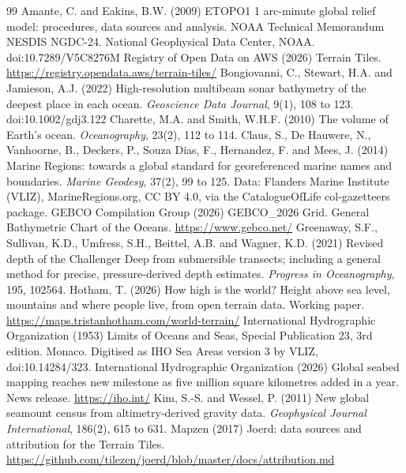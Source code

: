 \documentclass[11pt,a4paper]{article}
\begin{document}
\begin{thebibliography}{99}
 Amante, C. and Eakins, B.W. (2009) ETOPO1 1 arc-minute global relief model: procedures, data sources and analysis. NOAA Technical Memorandum NESDIS NGDC-24. National Geophysical Data Center, NOAA. doi:10.7289/V5C8276M
 Registry of Open Data on AWS (2026) Terrain Tiles. \url{https://registry.opendata.aws/terrain-tiles/}
 Bongiovanni, C., Stewart, H.A. and Jamieson, A.J. (2022) High-resolution multibeam sonar bathymetry of the deepest place in each ocean. \emph{Geoscience Data Journal}, 9(1), 108 to 123. doi:10.1002/gdj3.122
 Charette, M.A. and Smith, W.H.F. (2010) The volume of Earth's ocean. \emph{Oceanography}, 23(2), 112 to 114.
 Claus, S., De Hauwere, N., Vanhoorne, B., Deckers, P., Souza Dias, F., Hernandez, F. and Mees, J. (2014) Marine Regions: towards a global standard for georeferenced marine names and boundaries. \emph{Marine Geodesy}, 37(2), 99 to 125. Data: Flanders Marine Institute (VLIZ), MarineRegions.org, CC BY 4.0, via the CatalogueOfLife col-gazetteers package.
 GEBCO Compilation Group (2026) GEBCO\_2026 Grid. General Bathymetric Chart of the Oceans. \url{https://www.gebco.net/}
 Greenaway, S.F., Sullivan, K.D., Umfress, S.H., Beittel, A.B. and Wagner, K.D. (2021) Revised depth of the Challenger Deep from submersible transects; including a general method for precise, pressure-derived depth estimates. \emph{Progress in Oceanography}, 195, 102564.
 Hotham, T. (2026) How high is the world? Height above sea level, mountains and where people live, from open terrain data. Working paper. \url{https://maps.tristanhotham.com/world-terrain/}
 International Hydrographic Organization (1953) Limits of Oceans and Seas, Special Publication 23, 3rd edition. Monaco. Digitised as IHO Sea Areas version 3 by VLIZ, doi:10.14284/323.
 International Hydrographic Organization (2026) Global seabed mapping reaches new milestone as five million square kilometres added in a year. News release. \url{https://iho.int/}
 Kim, S.-S. and Wessel, P. (2011) New global seamount census from altimetry-derived gravity data. \emph{Geophysical Journal International}, 186(2), 615 to 631.
 Mapzen (2017) Joerd: data sources and attribution for the Terrain Tiles. \url{https://github.com/tilezen/joerd/blob/master/docs/attribution.md}

\end{thebibliography}
\end{document}
